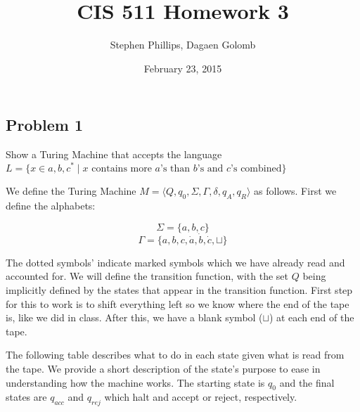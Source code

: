 \documentclass[english]{article}
\title{CIS 511 Homework 3}
\author{Stephen Phillips, Dagaen Golomb}
\date{February 23, 2015}
\begin{document}
\maketitle
\subsection*{Problem 1}
Show a Turing Machine that accepts the language
 $L = \{ x \in {a,b,c}^* \mid 
         \textrm{$x$ contains more $a$'s than $b$'s and $c$'s combined} \}$

We define the Turing Machine 
$M = \langle Q,q_0,\Sigma,\Gamma,\delta,q_A, q_R \rangle $ as follows. First
we define the alphabets:

\[ \Sigma = \{a,b,c\} \]
\[ \Gamma = \{a,b,c,\dot{a},\dot{b},\dot{c}, \sqcup \} \]

The dotted symbols' indicate marked symbols which we have already read and
accounted for. We will define the transition function, with the set $Q$ being
implicitly defined by the states that appear in the transition function. First
step for this to work is to shift everything left so we know where the end of the 
tape is, like we did in class. After this, we have a blank symbol ($\sqcup$) at each
end of the tape.

The following table describes what to do in each state given what is read from the
tape. We provide a short description of the state's purpose to ease in understanding
how the machine works. The starting state is $q_0$ and the final states are $q_{acc}$
and $q_{rej}$ which halt and accept or reject, respectively.
\end{document}
